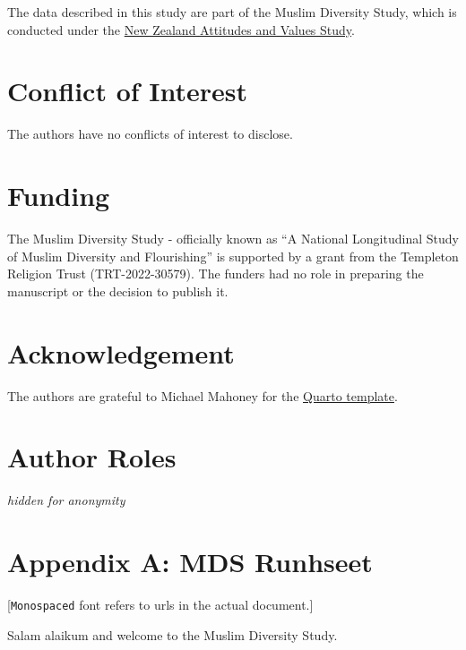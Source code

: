 \documentclass[
]{interact}
\begin{document}
The data described in this study are part of the Muslim Diversity Study,
which is conducted under the \href{https://osf.io/75snb/}{New Zealand
Attitudes and Values Study}.

\newpage{}

\section{Conflict of Interest}\label{conflict-of-interest}

The authors have no conflicts of interest to disclose.

\newpage{}

\section{Funding}\label{funding}

The Muslim Diversity Study - officially known as ``A National
Longitudinal Study of Muslim Diversity and Flourishing'' is supported by
a grant from the Templeton Religion Trust (TRT-2022-30579). The funders
had no role in preparing the manuscript or the decision to publish it.

\newpage{}

\section{Acknowledgement}\label{acknowledgement}

The authors are grateful to Michael Mahoney for the
\href{https://github.com/mikemahoney218/quarto-tandf}{Quarto template}.

\newpage{}

\section{Author Roles}\label{author-roles}

\emph{hidden for anonymity}

\newpage{}

\section{Appendix A: MDS Runhseet}\label{appendix-a-mds-runhseet}

{[}\texttt{Monospaced} font refers to urls in the actual document.{]}

\noindent Salam alaikum and welcome to the Muslim Diversity Study.
\end{document}

